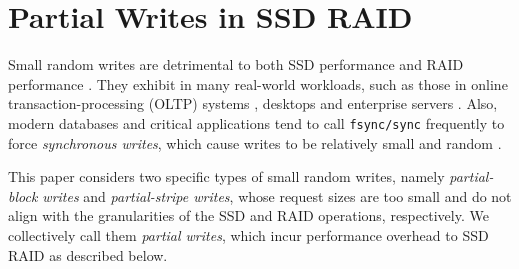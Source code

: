 \section{Partial Writes in SSD RAID}
\label{sec:partial}

Small random writes are detrimental to both SSD performance
\cite{kim08,chen09,min12} and RAID performance \cite{stodolsky93}.  They exhibit
in many real-world workloads, such as those in online transaction-processing
(OLTP) systems \cite{wong02}, desktops \cite{harter11} and enterprise servers
\cite{kavalanekar08}. Also, modern databases and critical applications tend to
call \texttt{fsync/sync} frequently to force {\em synchronous writes}, which
cause writes to be relatively small and random \cite{harter11}.
	   
	
This paper considers two specific types of small random writes,
namely {\em partial-block writes} and {\em partial-stripe writes}, whose
request sizes are too small and do not align with the granularities of the SSD
and RAID operations, respectively.  We collectively call them 
{\em partial writes}, which incur performance overhead to SSD RAID as
described below. 





